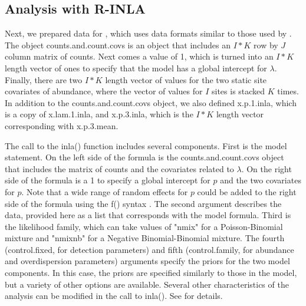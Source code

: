 \documentclass[article]{jss}
\begin{document}
\subsection[Analysis with R-INLA]{Analysis with R-INLA}
Next, we prepared data for , which uses data formats similar to those used by . The object counts.and.count.covs is an  object that includes an $I*K$ row by $J$ column matrix of counts. Next comes a value of 1, which is turned into an $I*K$ length vector of ones to specify that the model has a global intercept for $\lambda$. Finally, there are two $I*K$ length vector of values for the two static site covariates of abundance, where the vector of values for $I$ sites is stacked $K$ times. In addition to the counts.and.count.covs object, we also defined x.p.1.inla, which is a copy of x.lam.1.inla, and x.p.3.inla, which is the $I*K$ length vector corresponding with x.p.3.mean.


The call to the inla() function includes several components. First is the model statement. On the left side of the formula is the counts.and.count.covs object that includes the matrix of counts and the covariates related to $\lambda$.  On the right side of the formula is a 1 to specify a global intercept for $p$ and the two covariates for $p$.  Note that a wide range of random effects for $p$ could be added to the right side of the formula using the f() syntax \citep{Rue_Martino_Lindgren_Simpson_Riebler_2013}. The second argument describes the data, provided here as a list that corresponds with the model formula. Third is the likelihood family, which can take values of "nmix" for a Poisson-Binomial mixture and "nmixnb" for a Negative Binomial-Binomial mixture. The fourth (control.fixed, for detection parameters) and fifth (control.family, for abundance and overdispersion parameters) arguments specify the priors for the two model components. In this case, the priors are specified similarly to those in the  model, but a variety of other options are available. Several other characteristics of the analysis can be modified in the call to inla(). See \cite{Rue_Martino_Lindgren_Simpson_Riebler_2013} for details.
\end{document}
